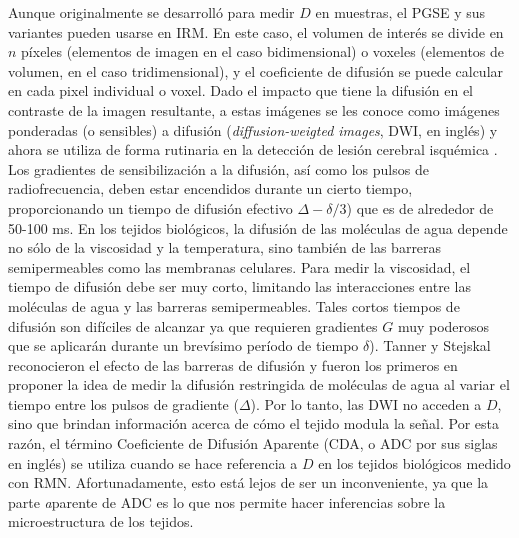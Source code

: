 Aunque originalmente se desarrolló para medir $D$ en muestras, el PGSE y sus variantes pueden usarse en IRM. En este caso, el volumen de interés se divide en $n$ píxeles (elementos de imagen en el caso bidimensional) o voxeles (elementos de volumen, en el caso tridimensional), y el coeficiente de difusión se puede calcular en cada pixel individual o voxel. Dado el impacto que tiene la difusión en el contraste de la imagen resultante, a estas imágenes se les conoce como imágenes ponderadas (o sensibles) a difusión (\textit{diffusion-weigted images}, DWI, en inglés) \cite{Wesbey_1984} y ahora se utiliza de forma rutinaria en la detección de lesión cerebral isquémica \cite{Sotak_2002}. Los gradientes de sensibilización a la difusión, así como los pulsos de radiofrecuencia, deben estar encendidos durante un cierto tiempo, proporcionando un tiempo de difusión efectivo $\Delta - \delta/3$) que es de alrededor de 50-100 ms. En los tejidos biológicos, la difusión de las moléculas de agua depende no sólo de la viscosidad y la temperatura, sino también de las barreras semipermeables como las membranas celulares. Para medir la viscosidad, el tiempo de difusión debe ser muy corto, limitando las interacciones entre las moléculas de agua y las barreras semipermeables. Tales cortos tiempos de difusión son difíciles de alcanzar ya que requieren gradientes $G$ muy poderosos que se aplicarán durante un brevísimo período de tiempo $\delta$). Tanner y Stejskal \cite{Tanner_1968} reconocieron el efecto de las barreras de difusión y fueron los primeros en proponer la idea de medir la difusión restringida de moléculas de agua al variar el tiempo entre los pulsos de gradiente ($\Delta$). Por lo tanto, las DWI no acceden a $D$, sino que brindan información acerca de cómo el tejido modula la señal. Por esta razón, el término Coeficiente de Difusión Aparente (CDA, o ADC por sus siglas en inglés) se utiliza cuando se hace referencia a $D$ en los tejidos biológicos medido con RMN. Afortunadamente, esto está lejos de ser un inconveniente, ya que la parte {\emph aparente} de ADC es lo que nos permite hacer inferencias sobre la microestructura de los tejidos.


